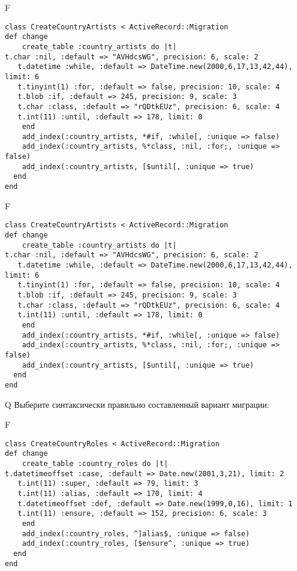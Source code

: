 F
\begin{verbatim}
class CreateCountryArtists < ActiveRecord::Migration
def change
	create_table :country_artists do |t|
t.char :nil, :default => "AVHdcsWG", precision: 6, scale: 2
   t.datetime :while, :default => DateTime.new(2000,6,17,13,42,44), limit: 6
   t.tinyint(1) :for, :default => false, precision: 10, scale: 4
   t.blob :if, :default => 245, precision: 9, scale: 3
   t.char :class, :default => "rQDtkEUz", precision: 6, scale: 4
   t.int(11) :until, :default => 178, limit: 0
   	end
	add_index(:country_artists, *#if, :while[, :unique => false)
	add_index(:country_artists, %*class, :nil, :for;, :unique => false)
	add_index(:country_artists, [$until[, :unique => true)
  end 
end

\end{verbatim}

F
\begin{verbatim}
class CreateCountryArtists < ActiveRecord::Migration
def change
	create_table :country_artists do |t|
t.char :nil, :default => "AVHdcsWG", precision: 6, scale: 2
   t.datetime :while, :default => DateTime.new(2000,6,17,13,42,44), limit: 6
   t.tinyint(1) :for, :default => false, precision: 10, scale: 4
   t.blob :if, :default => 245, precision: 9, scale: 3
   t.char :class, :default => "rQDtkEUz", precision: 6, scale: 4
   t.int(11) :until, :default => 178, limit: 0
   	end
	add_index(:country_artists, *#if, :while[, :unique => false)
	add_index(:country_artists, %*class, :nil, :for;, :unique => false)
	add_index(:country_artists, [$until[, :unique => true)
  end 
end

\end{verbatim}

Q
Выберите синтаксически правильно составленный вариант миграции:

F
\begin{verbatim}
class CreateCountryRoles < ActiveRecord::Migration
def change
	create_table :country_roles do |t|
t.datetimeoffset :case, :default => Date.new(2001,3,21), limit: 2
   t.int(11) :super, :default => 79, limit: 3
   t.int(11) :alias, :default => 170, limit: 4
   t.datetimeoffset :def, :default => Date.new(1999,0,16), limit: 1
   t.int(11) :ensure, :default => 152, precision: 6, scale: 3
   	end
	add_index(:country_roles, ^]alias$, :unique => false)
	add_index(:country_roles, [$ensure^, :unique => true)
  end 
end

\end{verbatim}

